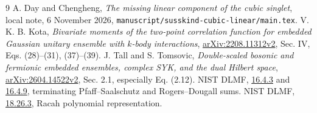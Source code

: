 \documentclass[11pt,a4paper]{article}
\begin{document}
\begin{thebibliography}{9}\small
{} A. Day and Chengheng, \emph{The missing linear
component of the cubic singlet}, local note, 6 November 2026,
\texttt{manuscript/susskind-cubic-linear/main.tex}.
 V. K. B. Kota, \emph{Bivariate moments of the two-point
correlation function for embedded Gaussian unitary ensemble with
$k$-body interactions}, \href{https://arxiv.org/html/2208.11312}{arXiv:2208.11312v2},
Sec. IV, Eqs. (28)--(31), (37)--(39).
 J. Tall and S. Tomsovic, \emph{Double-scaled bosonic
and fermionic embedded ensembles, complex SYK, and the dual Hilbert
space}, \href{https://arxiv.org/html/2604.14522v2}{arXiv:2604.14522v2},
Sec. 2.1, especially Eq. (2.12).
 NIST DLMF,
\href{https://dlmf.nist.gov/16.4.E3}{16.4.3} and
\href{https://dlmf.nist.gov/16.4.E9}{16.4.9}, terminating
Pfaff--Saalschutz and Rogers--Dougall sums.
 NIST DLMF,
\href{https://dlmf.nist.gov/18.26.E3}{18.26.3}, Racah polynomial representation.
\end{thebibliography}
\end{document}
